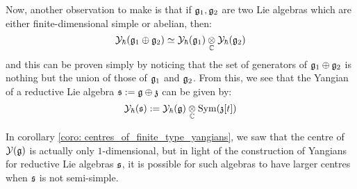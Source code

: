         Now, another observation to make is that if $\mathfrak{g}_1, \mathfrak{g}_2$ are two Lie algebras which are either finite-dimensional simple or abelian, then:
            $$\calY_{\hbar}(\g_1 \oplus \g_2) \cong \calY_{\hbar}(\g_1) \tensor_{\bbC} \calY_{\hbar}(\g_2)$$
        and this can be proven simply by noticing that the set of generators of $\mathfrak{g}_1 \oplus \mathfrak{g}_2$ is nothing but the union of those of $\mathfrak{g}_1$ and $\mathfrak{g}_2$. From this, we see that the Yangian of a reductive Lie algebra $\mathfrak{s} := \mathfrak{g} \oplus \mathfrak{z}$ can be given by:
            $$\calY_{\hbar}(\s) := \calY_{\hbar}(\g) \tensor_{\bbC} \Sym(\z[t])$$

        In corollary \ref{coro: centres_of_finite_type_yangians}, we saw that the centre of $\mathcal{Y}(\mathfrak{g})$ is actually only $1$-dimensional, but in light of the construction of Yangians for reductive Lie algebras $\mathfrak{s}$, it is possible for such algebras to have larger centres when $\mathfrak{s}$ is not semi-simple.

